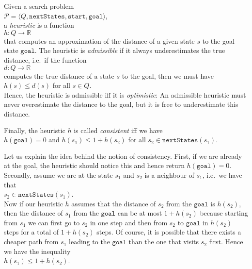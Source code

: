 \begin{Definition}[Heuristic]
Given a search problem
\\[0.2cm]
\hspace*{1.3cm}
$\mathcal{P} = \langle Q, \mathtt{nextStates}, \mathtt{start}, \mathtt{goal} \rangle$,
\\[0.2cm]
a \emph{\color{blue}heuristic} is a function
\\[0.2cm]
\hspace*{1.3cm}
$h: Q \rightarrow \mathbb{R}$
\\[0.2cm]
that computes an approximation of the distance of a given state $s$ to the goal state $\mathtt{goal}$.
The heuristic is \emph{\color{blue}admissible} if it always underestimates the true distance, i.e.~if the function
\\[0.2cm]
\hspace*{1.3cm}
$d:Q \rightarrow \mathbb{R}$
\\[0.2cm]
computes the true distance of a state $s$ to the goal, then we must have
\\[0.2cm]
\hspace*{1.3cm}
$h(s) \leq d(s)$ \quad for all $s \in Q$.
\\[0.2cm]
Hence, the heuristic is admissible iff it is \emph{\color{blue}optimistic}:  An admissible heuristic must never overestimate the
distance to the goal, but it is free to underestimate this distance.

Finally, the  heuristic $h$ is called \emph{\color{blue}consistent} iff we have
\\[0.2cm]
\hspace*{1.3cm}
$h(\mathtt{goal}) = 0$ \quad and \quad $h(s_1) \leq 1 + h(s_2)$ \quad for all $s_2 \in \mathtt{nextStates}(s_1)$.  \eod
\end{Definition}

Let us explain the idea behind the notion of consistency.  First, if we are already at the goal, the heuristic
should notice this and hence return $h(\mathtt{goal}) = 0$.  Secondly, assume we are at the state $s_1$ and $s_2$ is a
neighbour of $s_1$, i.e.~we have that 
\\[0.2cm]
\hspace*{1.3cm}
$s_2 \in \mathtt{nextStates}(s_1)$.
\\[0.2cm]
Now if our heuristic $h$ assumes that the distance of $s_2$ from the $\mathtt{goal}$ is $h(s_2)$, then the distance of
$s_1$ from the $\mathtt{goal}$ can be at most $1 + h(s_2)$ because starting from $s_1$ we can first go to $s_2$
in one step and then from $s_2$ to $\mathtt{goal}$ in $h(s_2)$ steps for a total of $1 + h(s_2)$ steps.  Of
course, it is possible that there exists a cheaper path from $s_1$ leading to the $\mathtt{goal}$ than the one
that visits $s_2$ first.  Hence we have the inequality 
\\[0.2cm]
\hspace*{1.3cm}
$h(s_1) \leq 1 + h(s_2)$.

